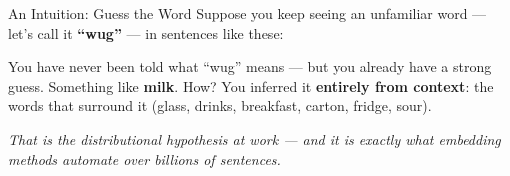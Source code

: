 \documentclass[aspectratio=169]{beamer}
\begin{document}
\begin{frame}{An Intuition: Guess the Word}
\vspace{0.2cm}
{\small Suppose you keep seeing an unfamiliar word --- let's call it \textbf{``wug''} ---
in sentences like these:}

\medskip
{}

\bigskip
{\small You have never been told what ``wug'' means --- but you already have a strong guess.
Something like \textbf{milk}. How? You inferred it \textbf{entirely from context}: the words
that surround it (glass, drinks, breakfast, carton, fridge, sour).}

\medskip
{\small\textcolor{midgray}{\textit{That is the distributional hypothesis at work --- and it is
exactly what embedding methods automate over billions of sentences.}}}
\end{frame}
\end{document}
